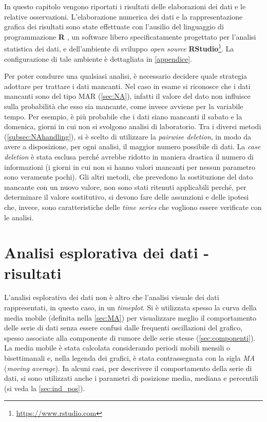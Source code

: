 In questo capitolo vengono riportati i risultati delle elaborazioni dei dati e le relative osservazioni. L'elaborazione numerica dei dati e la rappresentazione grafica dei risultati sono state effettuate con l'ausilio del linguaggio di programmazione \textbf{R} \cite{introR}, un software libero specificatamente progettato per l'analisi statistica dei dati, e dell'ambiente di sviluppo \textit{open source} \textbf{RStudio\texttrademark}\footnote{\url{https://www.rstudio.com}}. La configurazione di tale ambiente è dettagliata in \autoref{appendice}.

Per poter condurre una qualsiasi analisi, è necessario decidere quale strategia adottare per trattare i dati mancanti. 
Nel caso in esame si riconosce che i dati mancanti sono del tipo MAR (\autoref{sec:NA}), infatti il valore del dato non influisce sulla probabilità che esso sia mancante, come invece avviene per la variabile tempo. Per esempio, è più probabile che i dati siano mancanti il sabato e la domenica, giorni in cui non si svolgono analisi di laboratorio.
Tra i diversi metodi (\autoref{subsec:NAhandling}), si è scelto di utilizzare la \textit{pairwise deletion}, in modo da avere a disposizione, per ogni analisi, il maggior numero possibile di dati. La \textit{case deletion} è stata esclusa perché avrebbe ridotto in maniera drastica il numero di informazioni (i giorni in cui non si hanno valori mancanti per nessun parametro sono veramente pochi). Gli altri metodi, che prevedono la sostituzione del dato mancante con un nuovo valore, non sono stati ritenuti applicabili perché, per determinare il valore sostitutivo, si devono fare delle assunzioni e delle ipotesi che, invece, sono caratteristiche delle \textit{time series} che vogliono essere verificate con le analisi. 

\section{Analisi esplorativa dei dati - risultati}
\label{sec:an_espl}
L'analisi esplorativa dei dati non è altro che l'analisi visuale dei dati rappresentati, in questo caso, in un \textit{timeplot}. Si è utilizzata spesso la curva della media mobile (definita nella \autoref{sec:MA}) per visualizzare meglio il comportamento delle serie di dati senza essere confusi dalle frequenti oscillazioni del grafico, spesso associate alla componente di rumore delle serie stesse (\autoref{sec:componenti}). La media mobile è stata calcolata considerando periodi mobili mensili o bisettimanali e, nella legenda dei grafici, è stata contrassegnata con la sigla \textit{MA} (\textit{moving average}). In alcuni casi, per descrivere il comportamento della serie di dati, si sono utilizzati anche i parametri di posizione media, mediana e percentili (si veda la \autoref{sec:ind_pos}).


